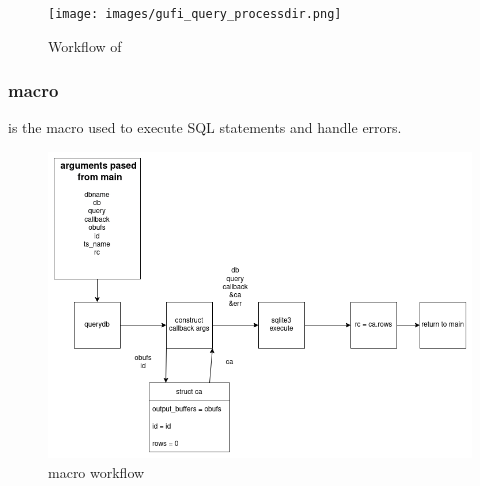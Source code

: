 \begin{figure} [H]
  \centering
  \texttt{[image: images/gufi\_query\_processdir.png]}
  \caption{Workflow of \processdir}
\end{figure}

\subsubsection{\querydb macro}
\querydb is the macro used to execute SQL statements and handle errors.

\begin{figure} [H]
  \centering
  \includegraphics[width=\textwidth]{images/querydb_macro.png}
  \caption{\querydb macro workflow}
\end{figure}
